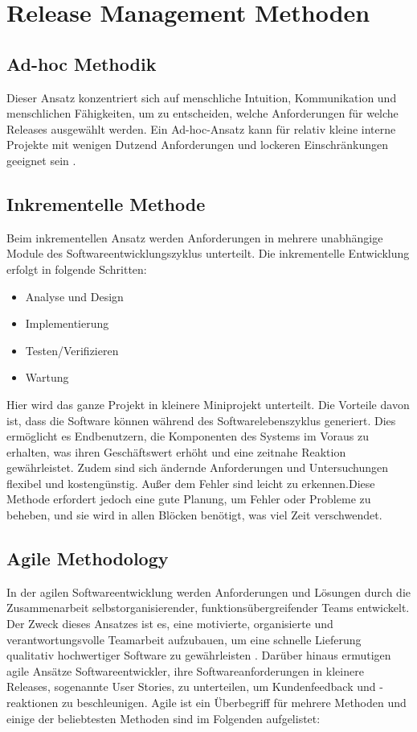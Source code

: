 \chapter{Release Management Methoden}

\section{Ad-hoc Methodik}

Dieser Ansatz konzentriert sich auf menschliche Intuition, Kommunikation und menschlichen Fähigkeiten, um zu entscheiden, welche Anforderungen für welche Releases ausgewählt werden. Ein Ad-hoc-Ansatz kann für relativ kleine interne Projekte mit wenigen Dutzend Anforderungen und lockeren Einschränkungen geeignet sein \cite{Mohamed2016:Devops}.

\section{Inkrementelle Methode}

Beim inkrementellen Ansatz werden Anforderungen in mehrere unabhängige Module des Softwareentwicklungszyklus unterteilt. Die inkrementelle Entwicklung erfolgt in folgende Schritten:
\begin{itemize}
	\item Analyse und Design
	\item Implementierung
	\item Testen/Verifizieren
	\item Wartung
\end{itemize}

Hier wird das ganze Projekt in kleinere Miniprojekt unterteilt. Die Vorteile davon ist, dass die Software können während des Softwarelebenszyklus generiert. Dies ermöglicht es Endbenutzern, die Komponenten des Systems im Voraus zu erhalten,
was ihren Geschäftswert erhöht und eine zeitnahe Reaktion gewährleistet. Zudem sind sich ändernde Anforderungen und Untersuchungen flexibel und kostengünstig. Außer dem Fehler sind leicht zu erkennen.Diese Methode erfordert jedoch eine
gute Planung, um Fehler oder Probleme zu beheben, und sie wird in allen Blöcken benötigt, was viel Zeit verschwendet.

\section{Agile Methodology}

In der agilen Softwareentwicklung werden Anforderungen und Lösungen durch die
Zusammenarbeit selbstorganisierender, funktionsübergreifender Teams entwickelt.
Der Zweck dieses Ansatzes ist es, eine motivierte, organisierte und verantwortungsvolle
Teamarbeit aufzubauen, um eine schnelle Lieferung qualitativ hochwertiger
Software zu gewährleisten \cite{digite.com:agile}. Darüber hinaus ermutigen agile Ansätze Softwareentwickler,
ihre Softwareanforderungen in kleinere Releases, sogenannte User Stories,
zu unterteilen, um Kundenfeedback und -reaktionen zu beschleunigen.
Agile ist ein Überbegriff für mehrere Methoden und einige der beliebtesten Methoden
sind im Folgenden aufgelistet:

